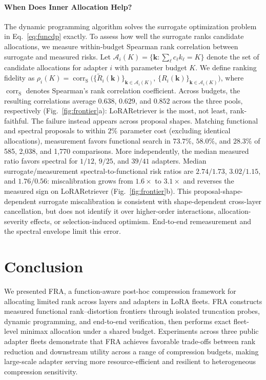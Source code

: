 \documentclass{article}
\begin{document}
\paragraph{When Does Inner Allocation Help?}
The dynamic programming algorithm solves the surrogate optimization problem in Eq.~\eqref{eq:funcdp} exactly.
To assess how well the surrogate ranks candidate allocations, we measure within-budget Spearman rank correlation between surrogate and measured risks.
Let $\mathcal{A}_i(K) = \{\mathbf{k} : \sum_\ell c_\ell k_\ell = K\}$ denote the set of candidate allocations for adapter $i$ with parameter budget $K$.
We define ranking fidelity as
$\rho_i(K) = \operatorname{corr}_{\mathrm{S}}\!\big(
  \{\widetilde R_i(\mathbf{k})\}_{\mathbf{k}\in\mathcal{A}_i(K)},\,
  \{R_i(\mathbf{k})\}_{\mathbf{k}\in\mathcal{A}_i(K)}
\big)$,
where $\operatorname{corr}_{\mathrm{S}}$ denotes Spearman's rank correlation coefficient.
Across budgets, the resulting correlations average $0.638$, $0.629$, and $0.852$ across the three pools, respectively (Fig.~\ref{fig:frontier}a): LoRARetriever is the most, not least, rank-faithful.
The failure instead appears across proposal shapes. Matching functional and
spectral proposals to within $2\%$ parameter cost (excluding identical
allocations), measurement favors functional search in $73.7\%$, $58.0\%$, and
$28.3\%$ of 585, 2,038, and 1,770 comparisons. More independently, the median
measured ratio favors spectral for $1/12$, $9/25$, and $39/41$ adapters.
Median surrogate/measurement spectral-to-functional risk ratios are
$2.74/1.73$, $3.02/1.15$, and $1.76/0.56$: miscalibration grows from $1.6\times$
to $3.1\times$ and reverses the measured sign on LoRARetriever
(Fig.~\ref{fig:frontier}b). This
proposal-shape-dependent surrogate miscalibration is consistent with
shape-dependent cross-layer cancellation, but does not identify it over
higher-order interactions, allocation-severity effects, or selection-induced
optimism. End-to-end remeasurement and the spectral envelope limit this error.

\FloatBarrier
\section{Conclusion}
\label{sec:conclusion}

We presented FRA, a function-aware post-hoc compression framework for allocating limited rank across layers and adapters in LoRA fleets. FRA constructs measured functional rank–distortion frontiers through isolated truncation probes, dynamic programming, and end-to-end verification, then performs exact fleet-level minimax allocation under a shared budget. Experiments across three public adapter fleets demonstrate that FRA achieves favorable trade-offs between rank reduction and downstream utility across a range of compression budgets, making large-scale adapter serving more resource-efficient and resilient to heterogeneous compression sensitivity.
\end{document}
